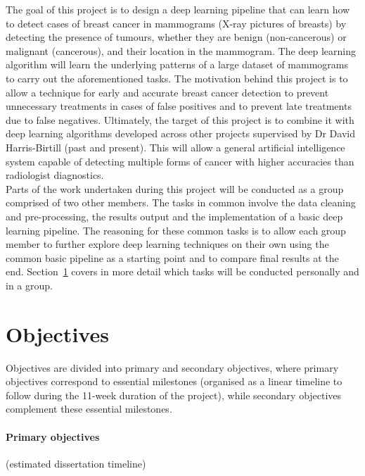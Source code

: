 \documentclass[letterpaper,12pt]{article}
\begin{document}
The goal of this project is to design a deep learning pipeline that can learn how to detect cases of breast cancer in mammograms (X-ray pictures of breasts) by detecting the presence of tumours, whether they are benign (non-cancerous) or malignant (cancerous), and their location in the mammogram. The deep learning algorithm will learn the underlying patterns of a large dataset of mammograms to carry out the aforementioned tasks. The motivation behind this project is to allow a technique for early and accurate breast cancer detection to prevent unnecessary treatments in cases of false positives and to prevent late treatments due to false negatives. Ultimately, the target of this project is to combine it with deep learning algorithms developed across other projects supervised by Dr David Harris-Birtill (past and present). This will allow a general artificial intelligence system capable of detecting multiple forms of cancer with higher accuracies than radiologist diagnostics.\\

Parts of the work undertaken during this project will be conducted as a group comprised of two other members. The tasks in common involve the data cleaning and pre-processing, the results output and the implementation of a basic deep learning pipeline. The reasoning for these common tasks is to allow each group member to further explore deep learning techniques on their own using the common basic pipeline as a starting point and to compare final results at the end. Section~\ref{sec:objectives} covers in more detail which tasks will be conducted personally and in a group.


\section{Objectives}
\label{sec:objectives}

Objectives are divided into primary and secondary objectives, where primary objectives correspond to essential milestones (organised as a linear timeline to follow during the 11-week duration of the project), while secondary objectives complement these essential milestones.

\paragraph{Primary objectives} (estimated dissertation timeline)
\end{document}
